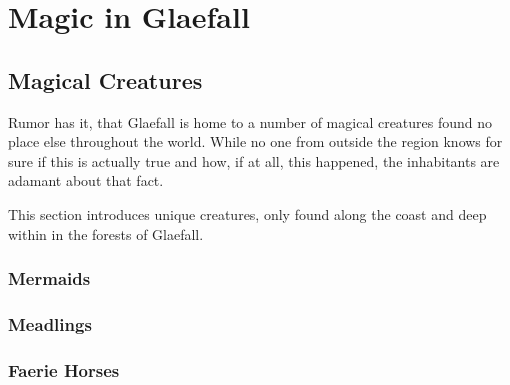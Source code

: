 \chapter{Magic in Glaefall}

\section{Magical Creatures}

Rumor has it, that Glaefall is home to a number of magical creatures found no place else throughout the world.
While no one from outside the region knows for sure if this is actually true and how, if at all, this happened, the inhabitants are adamant about that fact.

This section introduces unique creatures, only found along the coast and deep within in the forests of Glaefall.

\subsection{Mermaids}

\subsection{Meadlings}

\subsection{Faerie Horses}